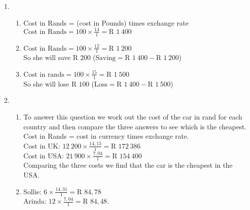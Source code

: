  \begin{solutions}{}{
\begin{enumerate}[itemsep=5pt, label=\textbf{\arabic*}. ] 


\item \begin{enumerate}[noitemsep, label=\textbf{(\alph*)} ]
\item Cost in Rands = (cost in Pounds) times exchange rate\\
$\text{Cost in Rands}=100 \times \frac{14}{1} = \text{R }1~400$
\item $\text{Cost in Rands}=100 \times \frac{12}{1} = \text{R }1~200$\\
So she will save $\text{R }200$ ($\text{Saving} = \text{R }1~400 - \text{R }1~200$)
\item $\text{Cost in rands}=100 \times \frac{15}{1} = \text{R }1~500$ \\
So she will lose $\text{R }100$ ($\text{Loss} = \text{R }1~400 - \text{R }1~500$)
\end{enumerate}
\item \begin{enumerate}[noitemsep, label=\textbf{(\alph*)} ]
\item To answer this question we work out the cost of the car in rand for each country and then compare the three answers to see which is the cheapest. Cost in Rands = cost in currency times exchange rate.\\
Cost in UK: $12~200 \times \frac{14,13}{1} = \text{R }172~386$\\
Cost in USA: $21~900 \times \frac{7,04}{1} = \text{R }154~400$\\
Comparing the three costs we find that the car is the cheapest in the USA.
\item Sollie: $6 \times \frac{14,31}{1} = \text{R }84,78$\\
Arinda: $12 \times \frac{7,04}{1} = \text{R }84,48$.
\end{enumerate}

\end{enumerate}}
\end{solutions}



